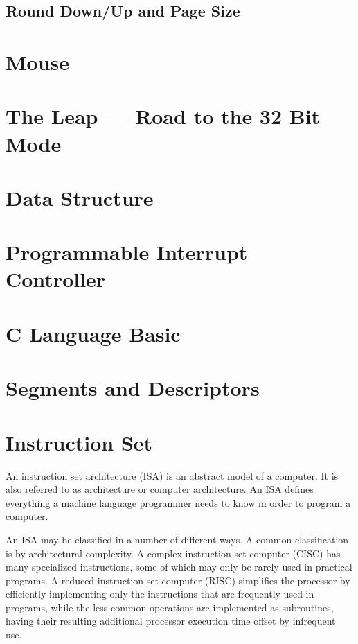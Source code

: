 \documentclass{swfcthesis}
\begin{document}
\subsection{Round Down/Up and Page Size}
\label{sec:round-downup-page}


\section{Mouse}
\label{sec:mouse}

\section{The Leap --- Road to the 32 Bit Mode}
\label{sec:leap-road-32}

\section{Data Structure}
\label{sec:data-structure}

\section{Programmable Interrupt Controller}

\section{C Language Basic}

\section{Segments and Descriptors}

\section{Instruction Set}

An instruction set architecture (ISA) is an abstract model of a computer. It is also
referred to as architecture or computer architecture. An ISA defines everything a machine
language programmer needs to know in order to program a computer.

An ISA may be classified in a number of different ways. A common classification is by
architectural complexity. A complex instruction set computer (CISC) has many specialized
instructions, some of which may only be rarely used in practical programs. A reduced
instruction set computer (RISC) simplifies the processor by efficiently implementing only
the instructions that are frequently used in programs, while the less common operations
are implemented as subroutines, having their resulting additional processor execution time
offset by infrequent use.
\end{document}
